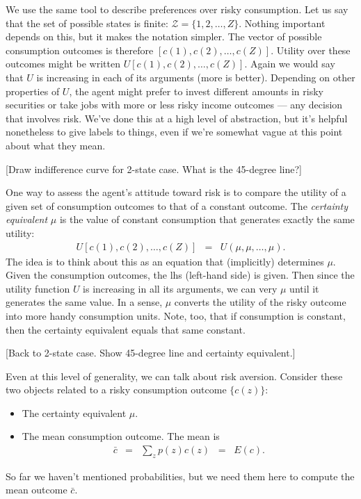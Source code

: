 \documentclass[11pt]{article}
\newcommand{\cbar}{\bar{c}}
\begin{document}
We use the same tool to describe preferences
over risky consumption.
Let us say that the set of possible states is finite:
$ \mathcal{Z} = \{ 1, 2, \ldots, Z \}$.
Nothing important depends on this, but it makes the notation simpler.
The vector of possible consumption outcomes is therefore
$[c(1), c(2), \ldots, c(Z)]$.
Utility over these outcomes might be written
$U [c(1), c(2), \ldots, c(Z)]$.
Again we would say that $U$ is increasing in each of its arguments
(more is better).
Depending on other properties of $U$,
the agent might prefer to invest different amounts in
risky securities or take jobs with more or less risky income outcomes ---
any decision that involves risk.
We've done this at a high level of abstraction,
but it's helpful nonetheless to give labels to things,
even if we're somewhat vague at this point about what they mean.

[Draw indifference curve for 2-state case. What is the 45-degree line?]

One way to assess the agent's attitude toward risk
is to compare the utility of a given set of consumption outcomes
to that of a constant outcome.
The {\it certainty equivalent\/} $\mu$
is the value of constant consumption
that generates exactly the same utility:
\begin{eqnarray}
    U [c(1), c(2), \ldots, c(Z)]
            &=& U (\mu, \mu, \ldots, \mu ) .
    \label{eq:certequiv-def}
\end{eqnarray}
The idea is to think about this as an equation that (implicitly) determines $\mu$.
Given the consumption outcomes, the lhs (left-hand side) is given.
Then since the utility function $U$ is increasing in all its arguments,
we can very $\mu$ until it generates the same value.
In a sense, $\mu$ converts the utility of the risky outcome
into more handy consumption units.
Note, too, that if consumption is constant, then the certainty
equivalent equals that same constant.

[Back to 2-state case.
Show 45-degree line and certainty equivalent.]

Even at this level of generality, we can talk about risk aversion.
Consider these two objects related to a risky consumption
outcome $\{ c(z)\}$:
%
\begin{itemize}
\item The certainty equivalent $\mu$.

\item The mean consumption outcome.  The mean is
\begin{eqnarray*}
    \cbar &=& \sum_z p(z) c(z) \;\;=\;\; E(c) .
\end{eqnarray*}
\end{itemize}
So far we haven't mentioned probabilities, but we need them here to
compute the mean outcome $\cbar$.
\end{document}
